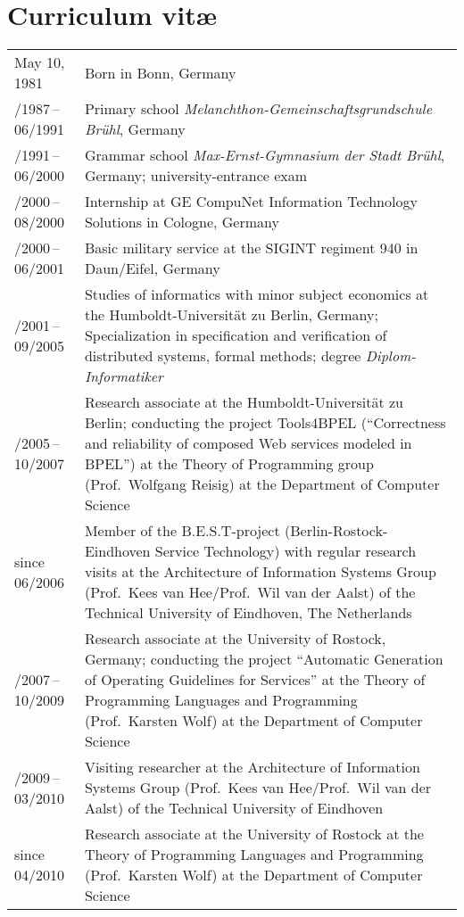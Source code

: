 \endgroup

\chapter*{Curriculum vit\ae}

{\small
\begin{tabularx}{\textwidth}{lX}
\medskip May 10, 1981 & Born in Bonn, Germany \\
\medskip 08/1987\,--\,06/1991 & Primary school \emph{Melanchthon-Gemeinschaftsgrundschule Br\"uhl}, Germany\\ 
\medskip 08/1991\,--\,06/2000 & Grammar school \emph{Max-Ernst-Gymnasium der Stadt Br\"uhl}, Germany; university-entrance exam \\
\medskip 07/2000\,--\,08/2000 & Internship at GE CompuNet Information Technology Solutions in Cologne, Germany \\
\medskip 09/2000\,--\,06/2001 & Basic military service at the SIGINT regiment 940 in Daun/Eifel, Germany\\
\medskip 10/2001\,--\,09/2005 & Studies of informatics with minor subject economics at the Humboldt-Universit\"at zu Berlin, Germany; Specialization in specification and verification of distributed systems, formal methods; degree \emph{Diplom-Informatiker}\\
\medskip 10/2005\,--\,10/2007 & Research associate at the Humboldt-Universit\"at zu Berlin; conducting the project Tools4BPEL (``Correctness and reliability of composed Web services modeled in BPEL'') at the Theory of Programming group (Prof.\ Wolfgang Reisig) at the Department of Computer Science\\
\medskip since 06/2006 & Member of the B.E.S.T-project (Berlin-Rostock-Eindhoven Service Technology) with regular research visits at the Architecture of Information Systems Group (Prof.\ Kees van Hee/Prof.\ Wil van der Aalst) of the Technical University of Eindhoven, The Netherlands \\
\medskip 11/2007\,--\,10/2009 & Research associate at the University of Rostock, Germany; conducting the project ``Automatic Generation of Operating Guidelines for Services'' at the Theory of Programming Languages and Programming (Prof.\ Karsten Wolf) at the Department of Computer Science\\
\medskip 11/2009\,--\,03/2010 & Visiting researcher at the Architecture of Information Systems Group (Prof.\ Kees van Hee/Prof.\ Wil van der Aalst) of the Technical University of Eindhoven\\
\medskip since 04/2010 & Research associate at the University of Rostock at the Theory of Programming Languages and Programming (Prof.\ Karsten Wolf) at the Department of Computer Science \\
\end{tabularx}
}
